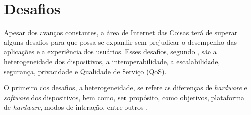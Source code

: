 







\section{Desafios}

Apesar dos avanços constantes, a área de Internet das Coisas terá de superar alguns desafios para que possa se expandir sem prejudicar o desempenho das aplicações e a experiência dos usuários. Esses desafios, segundo , são a heterogeneidade dos dispositivos, a interoperabilidade, a escalabilidade, segurança, privacidade e Qualidade de Serviço (QoS).

O primeiro dos desafios, a heterogeneidade, se refere as diferenças de \textit{hardware} e \textit{software} dos dispositivos, bem como, seu propósito, como objetivos, plataforma de \textit{hardware}, modos de interação, entre outros \cite{Hussain2016}. %

